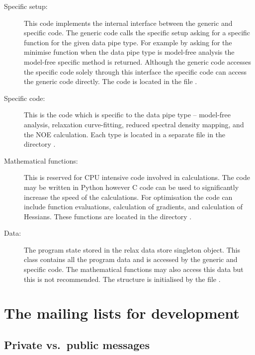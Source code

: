 \begin{description}
\item[Specific setup:]  This code implements the internal interface between the generic and specific code.  The generic code calls the specific setup asking for a specific function for the given data pipe type.  For example by asking for the minimise function when the data pipe type is model-free analysis the model-free specific  method is returned.  Although the generic code accesses the specific code solely through this interface the specific code can access the generic code directly.  The code is located in the file .

\item[Specific code:]  This is the code which is specific to the data pipe type -- model-free analysis, relaxation curve-fitting, reduced spectral density mapping, and the NOE calculation.  Each type is located in a separate file in the directory .

\item[Mathematical functions:]  This is reserved for CPU intensive code involved in calculations.  The code may be written in Python however C code can be used to significantly increase the speed of the calculations.  For optimisation the code can include function evaluations, calculation of gradients, and calculation of Hessians.  These functions are located in the directory .

\item[Data:]  The program state stored in the relax data store singleton object.  This class contains all the program data and is accessed by the generic and specific code.  The mathematical functions may also access this data but this is not recommended.  The structure is initialised by the file .
\end{description}





\section{The mailing lists for development}


\subsection{Private vs.\ public messages}

